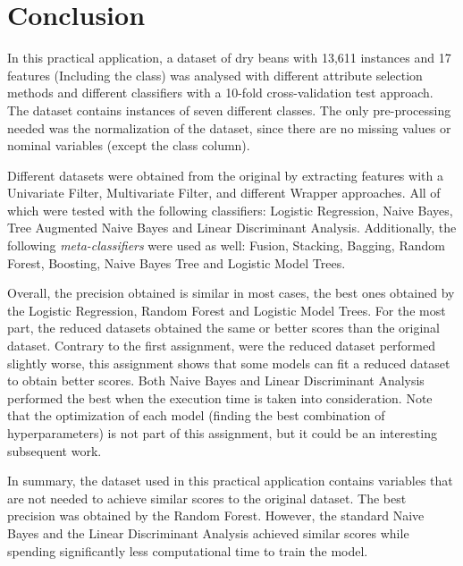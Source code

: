 \documentclass[a4paper,11pt]{article}
\begin{document}
\section{Conclusion}
\label{sec:conclusion}

In this practical application, a dataset of dry beans with 13,611 instances and 17 features (Including the class) was analysed with different attribute selection methods and different classifiers with a 10-fold cross-validation test approach. The dataset contains instances of seven different classes. The only pre-processing needed was the normalization of the dataset, since there are no missing values or nominal variables (except the class column).

Different datasets were obtained from the original by extracting features with a Univariate Filter, Multivariate Filter, and different Wrapper approaches. All of which were tested with the following classifiers: Logistic Regression, Naive Bayes, Tree Augmented Naive Bayes and Linear Discriminant Analysis. Additionally, the following \textit{meta-classifiers} were used as well: Fusion, Stacking, Bagging, Random Forest, Boosting, Naive Bayes Tree and Logistic Model Trees.

Overall, the precision obtained is similar in most cases, the best ones obtained by the Logistic Regression, Random Forest and Logistic Model Trees. For the most part, the reduced datasets obtained the same or better scores than the original dataset. Contrary to the first assignment, were the reduced dataset performed slightly worse, this assignment shows that some models can fit a reduced dataset to obtain better scores. Both Naive Bayes and Linear Discriminant Analysis performed the best when the execution time is taken into consideration. Note that the optimization of each model (finding the best combination of hyperparameters) is not part of this assignment, but it could be an interesting subsequent work.

In summary, the dataset used in this practical application contains variables that are not needed to achieve similar scores to the original dataset. The best precision was obtained by the Random Forest. However, the standard Naive Bayes and the Linear Discriminant Analysis  achieved similar scores while spending significantly less computational time to train the model.



\end{document}
